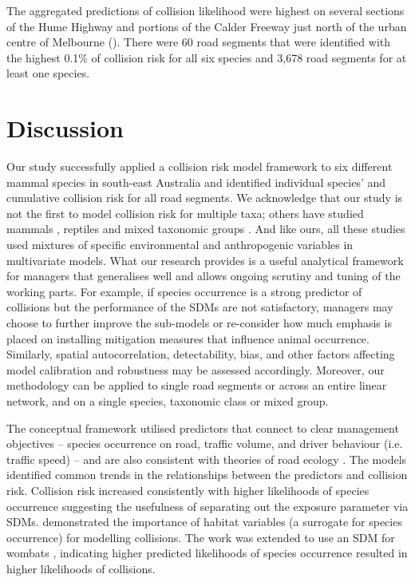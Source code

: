 The aggregated predictions of collision likelihood were highest on several sections of the Hume Highway and portions of the Calder Freeway just north of the urban centre of Melbourne (). There were 60 road segments that were identified with the highest 0.1\% of collision risk for all six species and 3,678 road segments for at least one species.

\section{Discussion}

Our study successfully applied a collision risk model framework to six different mammal species in south-east Australia and identified individual species' and cumulative collision risk for all road segments. We acknowledge that our study is not the first to model collision risk for multiple taxa; others have studied mammals \citep[e.g.][]{clev02,cser13,jaar06}, reptiles \citep[e.g.][]{guns12,lang12} and mixed taxonomic groups \citep[e.g.][]{clev02,garr15,lang09,litv08}.  And like ours, all these studies used mixtures of specific environmental and anthropogenic variables in multivariate models. What our research provides is a useful analytical framework for managers that generalises well and allows ongoing scrutiny and tuning of the working parts.  For example, if species occurrence is a strong predictor of collisions but the performance of the SDMs are not satisfactory, managers may choose to further improve the sub-models or re-consider how much emphasis is placed on installing mitigation measures that influence animal occurrence.  Similarly, spatial autocorrelation, detectability, bias, and other factors affecting model calibration and robustness may be assessed accordingly. Moreover, our methodology can be applied to single road segments or across an entire linear network, and on a single species, taxonomic class or mixed group.

The conceptual framework utilised predictors that connect to clear management objectives -- species occurrence on road, traffic volume, and driver behaviour (i.e. traffic speed) -- and are also consistent with theories of road ecology \citep[see][]{form03}. The models identified common trends in the relationships between the predictors and collision risk. Collision risk increased consistently with higher likelihoods of species occurrence suggesting the usefulness of separating out the exposure parameter via SDMs. \cite{roge09} demonstrated the importance of habitat variables (a surrogate for species occurrence) for modelling collisions. The work was extended to use an SDM for wombats \citep{roge12}, indicating higher predicted likelihoods of species occurrence resulted in higher likelihoods of collisions.

